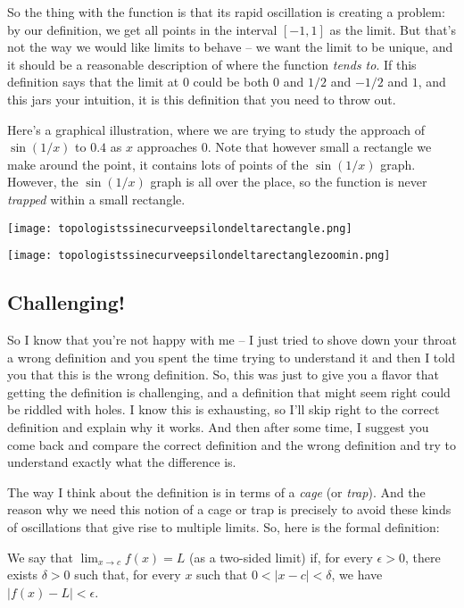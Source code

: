 \documentclass[10pt]{amsart}
\begin{document}
So the thing with the function is that its rapid oscillation is
creating a problem: by our definition, we get all points in the
interval $[-1,1]$ as the limit. But that's not the way we would like
limits to behave -- we want the limit to be unique, and it should be a
reasonable description of where the function {\em tends to}. If this
definition says that the limit at $0$ could be both $0$ and $1/2$ and
$-1/2$ and $1$, and this jars your intuition, it is this definition
that you need to throw out.

Here's a graphical illustration, where we are trying to study the
approach of $\sin(1/x)$ to $0.4$ as $x$ approaches $0$. Note that
however small a rectangle we make around the point, it contains lots
of points of the $\sin(1/x)$ graph. However, the $\sin(1/x)$ graph is
all over the place, so the function is never {\em trapped} within a
small rectangle.

\texttt{[image: topologistssinecurveepsilondeltarectangle.png]}

\texttt{[image: topologistssinecurveepsilondeltarectanglezoomin.png]}

\subsection{Challenging!}

So I know that you're not happy with me -- I just tried to shove down
your throat a wrong definition and you spent the time trying to
understand it and then I told you that this is the wrong
definition. So, this was just to give you a flavor that getting the
definition is challenging, and a definition that might seem right
could be riddled with holes. I know this is exhausting, so I'll skip
right to the correct definition and explain why it works. And then
after some time, I suggest you come back and compare the correct
definition and the wrong definition and try to understand exactly what
the difference is.

The way I think about the definition is in terms of a {\em cage} (or
{\em trap}). And the reason why we need this notion of a cage or trap
is precisely to avoid these kinds of oscillations that give rise to
multiple limits. So, here is the formal definition:

We say that $\lim_{x \to c} f(x) = L$ (as a two-sided limit) if, for
every $\epsilon > 0$, there exists $\delta > 0$ such that, for every
$x$ such that $0 < |x - c| < \delta$, we have $|f(x) - L| < \epsilon$.
\end{document}

